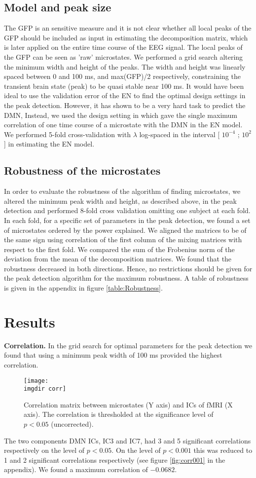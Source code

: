 \documentclass{article}
\newcommand{\imgdir}{Images/} %
\begin{document}
\subsection{Model and peak size}
The GFP is an sensitive measure and it is not clear whether all local peaks of the GFP should be included as input in estimating the decomposition matrix, which is later applied on the entire time course of the EEG signal. The local peaks of the GFP can be seen as 'raw' microstates. We performed a grid search altering the minimum width and height of the peaks. The width and height was linearly spaced between 0 and 100 ms, and max(GFP)/2 respectively, constraining the transient brain state (peak) to be quasi stable near 100 ms.
It would have been ideal to use the validation error of the EN to find the optimal design settings in the peak detection. However, it has shown to be a very hard task to predict the DMN, Instead, we used the design setting in which gave the single maximum correlation of one time course of a microstate with the DMN in the EN model.
We performed 5-fold cross-validation with $\lambda$ log-spaced in the interval 
[ $10^{-4}$ ; $10^2$] in estimating the EN model.
\subsection{Robustness of the microstates}
In order to evaluate the robustness of the algorithm of finding microstates, we altered the minimum peak width and height, as described above, in the peak detection and performed 8-fold cross validation omitting one subject at each fold. In each fold, for a specific set of parameters in the peak detection, we found a set of microstates ordered by the power explained. We aligned the matrices to be of the same sign using correlation of the first column of the mixing matrices with respect to the first fold. We compared the sum of the Frobenius norm of the deviation from the mean of the decomposition matrices. We found that the robustness decreased in both directions. Hence, no restrictions should be given for the peak detection algorithm for the maximum robustness. A table of robustness is given in the appendix in figure \ref{table:Robustness}.


\section{Results}

\textbf{Correlation.} In the grid search for optimal parameters for the peak detection we found that using a minimum peak width of 100 ms provided the highest correlation.
\begin{figure}[!ht]
    \centering
    \texttt{[image: \\imgdir corr]}
    \caption{Correlation matrix between microstates (Y axis) and ICs of fMRI (X axis). The correlation is thresholded at the significance level of $p<0.05$ (uncorrected).}
    \label{fig:grid}
\end{figure}
The two components DMN ICs, IC3 and IC7, had 3 and 5 significant correlations respectively on the level of $p<0.05$. On the level of $p<0.001$ this was reduced to 1 and 2 significant correlations respectively (see figure \ref{fig:corr001} in the appendix). We found a maximum correlation of $-0.0682$.
\end{document}
